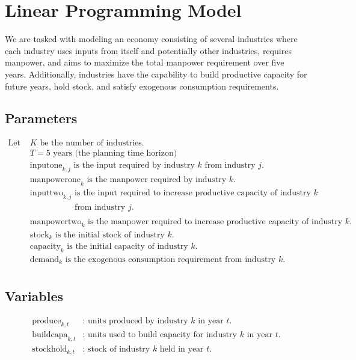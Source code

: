 \documentclass{article}
\begin{document}
\section*{Linear Programming Model}

We are tasked with modeling an economy consisting of several industries where each industry uses inputs from itself and potentially other industries, requires manpower, and aims to maximize the total manpower requirement over five years. Additionally, industries have the capability to build productive capacity for future years, hold stock, and satisfy exogenous consumption requirements.

\subsection*{Parameters}

\begin{align*}
    \text{Let } & K \text{ be the number of industries.} \\
    & T = 5 \text{ years (the planning time horizon)} \\
    & \text{inputone}_{k,j} \text{ is the input required by industry } k \text{ from industry } j. \\
    & \text{manpowerone}_k \text{ is the manpower required by industry } k. \\
    & \text{inputtwo}_{k,j} \text{ is the input required to increase productive capacity of industry } k \\
    & \phantom{\text{inputtwo}_{k,j}} \text{ from industry } j. \\
    & \text{manpowertwo}_k \text{ is the manpower required to increase productive capacity of industry } k. \\
    & \text{stock}_k \text{ is the initial stock of industry } k. \\
    & \text{capacity}_k \text{ is the initial capacity of industry } k. \\
    & \text{demand}_k \text{ is the exogenous consumption requirement from industry } k. \\
\end{align*}

\subsection*{Variables}

\begin{align*}
    \text{produce}_{k,t} & \text{: units produced by industry } k \text{ in year } t. \\
    \text{buildcapa}_{k,t} & \text{: units used to build capacity for industry } k \text{ in year } t. \\
    \text{stockhold}_{k,t} & \text{: stock of industry } k \text{ held in year } t. \\
\end{align*}
\end{document}
